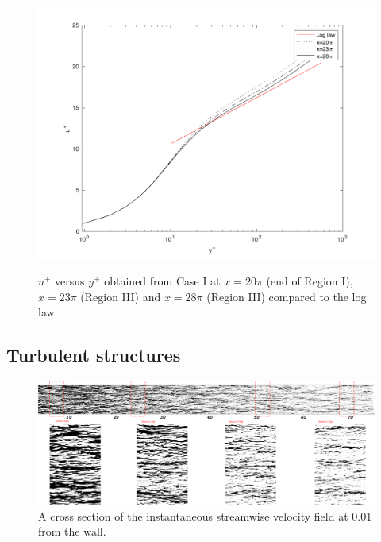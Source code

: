 \documentclass[twocolumn,10pt]{asme2e}
\begin{document}
\begin{figure}[t]
\centering
\scalebox{0.5}
{\includegraphics{log_law_CI_downstream.pdf}}
\caption{\(u^+\) versus \(y^+\) obtained from Case I at \(x=20{\pi}\) (end of Region I), \(x=23{\pi}\) (Region III) and \(x=28{\pi}\) (Region III) compared to the log law.}
\label{fig:log_law_CI_downstream}
\end{figure}

\subsection*{Turbulent structures}

\begin{figure}[t]
	\includegraphics[width=\textwidth]{streaks.pdf}
	\caption{A cross section of the instantaneous streamwise velocity field at 0.01 from the wall.}
	\label{fig:streaks}
\end{figure}
\end{document}
